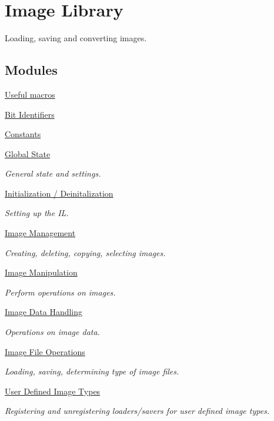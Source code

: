 \hypertarget{group___i_l}{\section{Image Library}
\label{group___i_l}
}


Loading, saving and converting images.  


\subsection*{Modules}
\begin{DoxyCompactItemize}
\item 
\hyperlink{group__il__macros}{Useful macros}
\item 
\hyperlink{group__il__bits}{Bit Identifiers}
\item 
\hyperlink{group__il__consts}{Constants}
\item 
\hyperlink{group__state}{Global State}
\begin{DoxyCompactList}\small\item\em General state and settings. \end{DoxyCompactList}\item 
\hyperlink{group__setup}{Initialization / Deinitalization}
\begin{DoxyCompactList}\small\item\em Setting up the I\+L. \end{DoxyCompactList}\item 
\hyperlink{group__image__mgt}{Image Management}
\begin{DoxyCompactList}\small\item\em Creating, deleting, copying, selecting images. \end{DoxyCompactList}\item 
\hyperlink{group__image__manip}{Image Manipulation}
\begin{DoxyCompactList}\small\item\em Perform operations on images. \end{DoxyCompactList}\item 
\hyperlink{group__data}{Image Data Handling}
\begin{DoxyCompactList}\small\item\em Operations on image data. \end{DoxyCompactList}\item 
\hyperlink{group__file}{Image File Operations}
\begin{DoxyCompactList}\small\item\em Loading, saving, determining type of image files. \end{DoxyCompactList}\item 
\hyperlink{group__register}{User Defined Image Types}
\begin{DoxyCompactList}\small\item\em Registering and unregistering loaders/savers for user defined image types. \end{DoxyCompactList}\end{DoxyCompactItemize}
